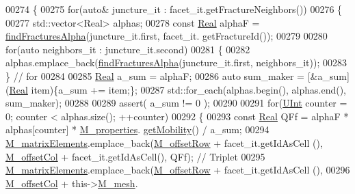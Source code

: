 \begin{DoxyCode}
00274     \{
00275         \textcolor{keywordflow}{for}(\textcolor{keyword}{auto}& juncture\_it : facet\_it.getFractureNeighbors())
00276         \{
00277             std::vector<Real> alphas;
00278             \textcolor{keyword}{const} \hyperlink{namespaceFVCode3D_a40c1f5588a248569d80aa5f867080e83}{Real} alphaF = \hyperlink{classFVCode3D_1_1StiffMatrix_a53ce514c7a4c784061b5339350e00995}{findFracturesAlpha}(juncture\_it.first, facet\_it.
      getFractureId());
00279 
00280             \textcolor{keywordflow}{for}(\textcolor{keyword}{auto} neighbors\_it : juncture\_it.second)
00281             \{
00282                 alphas.emplace\_back(\hyperlink{classFVCode3D_1_1StiffMatrix_a53ce514c7a4c784061b5339350e00995}{findFracturesAlpha}(juncture\_it.first, neighbors\_it));
00283             \} \textcolor{comment}{// for}
00284 
00285             \hyperlink{namespaceFVCode3D_a40c1f5588a248569d80aa5f867080e83}{Real} a\_sum = alphaF;
00286             \textcolor{keyword}{auto} sum\_maker = [&a\_sum](\hyperlink{namespaceFVCode3D_a40c1f5588a248569d80aa5f867080e83}{Real} item)\{a\_sum += item;\};
00287             std::for\_each(alphas.begin(), alphas.end(), sum\_maker);
00288 
00289             assert( a\_sum != 0 );
00290 
00291             \textcolor{keywordflow}{for}(\hyperlink{namespaceFVCode3D_a4bf7e328c75d0fd504050d040ebe9eda}{UInt} counter = 0; counter < alphas.size(); ++counter)
00292             \{
00293                 \textcolor{keyword}{const} \hyperlink{namespaceFVCode3D_a40c1f5588a248569d80aa5f867080e83}{Real} QFf = alphaF * alphas[counter] * \hyperlink{classFVCode3D_1_1MatrixHandler_ad17a7941b1b8272f50fc6e1c660103fa}{M\_properties}.
      \hyperlink{classFVCode3D_1_1PropertiesMap_a810ea62ca881e4db57acd601bcea23cf}{getMobility}() / a\_sum;
00294                 \hyperlink{classFVCode3D_1_1MatrixHandler_a0bbdfb8d779ca20d8ba69b99cac1f4d6}{M\_matrixElements}.emplace\_back(\hyperlink{classFVCode3D_1_1MatrixHandler_ad3faa8b15bca6e0052be8c868b924444}{M\_offsetRow} + facet\_it.getIdAsCell
      (), \hyperlink{classFVCode3D_1_1MatrixHandler_a6ec7cf5178c1c25b54abc46ff0affcf2}{M\_offsetCol} + facet\_it.getIdAsCell(), QFf); \textcolor{comment}{// Triplet}
00295                 \hyperlink{classFVCode3D_1_1MatrixHandler_a0bbdfb8d779ca20d8ba69b99cac1f4d6}{M\_matrixElements}.emplace\_back(\hyperlink{classFVCode3D_1_1MatrixHandler_ad3faa8b15bca6e0052be8c868b924444}{M\_offsetRow} + facet\_it.getIdAsCell
      (),
00296                     \hyperlink{classFVCode3D_1_1MatrixHandler_a6ec7cf5178c1c25b54abc46ff0affcf2}{M\_offsetCol} + this->\hyperlink{classFVCode3D_1_1MatrixHandler_a72f185cb557fc2e8023bd09a074f685c}{M\_mesh}.

\end{DoxyCode}
